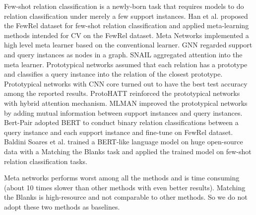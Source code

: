 Few-shot relation classification is a newly-born task that requires models to do relation classification under merely a few support instances. Han et al.  proposed the FewRel dataset for few-shot relation classification and applied meta-learning methods intended for CV \cite{metanet,gnn,snail,proto} %
on the FewRel dataset.
Meta Networks \cite{metanet} implemented a high level meta learner based on the
conventional learner.
GNN \cite{gnn} regarded support and query instances as nodes in a graph.
SNAIL \cite{snail} aggregated attention into the meta learner.
Prototypical networks \cite{proto} assumed that each relation has a prototype and classifies a query instance into the relation of the closest prototype.
Prototypical networks \cite{proto} with CNN core turned out to have the best test accuracy among the reported results. ProtoHATT \cite{hatt} reinforced the prototypical networks with hybrid attention mechanism. MLMAN \cite{ye-ling-2019-multi} improved the prototypical networks by adding mutual information between support instances and query instances. Bert-Pair \cite{gao-etal-2019-fewrel} adopted BERT \cite{devlin2018bert} to conduct binary relation classifications between a query instance and each support instance and fine-tune on FewRel dataset. Baldini Soares et al.  trained a BERT-like language model on huge open-source data with a Matching the Blanks task and applied the trained model on few-shot relation classification tasks.

Meta networks performs worst among all the methods \cite{han-etal-2018-fewrel} and
is time consuming (about 10 times slower than other methods with even better results).
Matching the Blanks is high-resource and not comparable to other methods. So we do not adopt these two methods as baselines.

